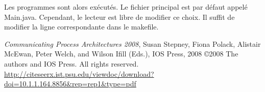 \documentclass[a4paper,11pt,french]{report}
\begin{document}
Les programmes sont alors exécutés. Le fichier principal est par défaut appelé Main.java. Cependant, le lecteur est libre de modifier ce choix. Il suffit de modifier la ligne correspondante dans le makefile.

\begin{thebibliography}{Cpa2008}
 {\textit{Communicating Process Architectures 2008}, Susan Stepney, Fiona Polack, Alistair McEwan, Peter Welch, and Wilson Ifill (Eds.), IOS Press, 2008
\copyright 2008 The authors and IOS Press. All rights reserved.\\
\url{http://citeseerx.ist.psu.edu/viewdoc/download?doi=10.1.1.164.8856&rep=rep1&type=pdf}}
\end{thebibliography}
\end{document}
